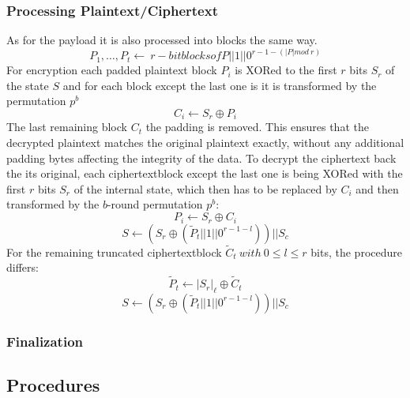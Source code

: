 \subsubsection{Processing Plaintext/Ciphertext}
As for the payload it is also processed into blocks the same way. 
$$P_1, \dots , P_t \leftarrow \ r-bit blocks of P || 1 || 0^{r-1-(|P| mod\ r)}$$
For encryption each padded plaintext block $P_i$ is XORed to the first $r$ bits $S_r$ of the state $S$ and for each block except the last one is it is transformed by the permutation $p^b$%
$$C_i \leftarrow S_r \oplus P_i$$
The last remaining block $C_t$ the padding is removed. This ensures that the decrypted plaintext matches the original plaintext exactly, without any additional padding bytes affecting the integrity of the data.
\newline
To decrypt the ciphertext back the its original, each ciphertextblock except the last one is being XORed with the first $r$ bits $S_r$ of the internal state, which then has to be replaced by $C_i$ and then transformed by the $b$-round permutation $p^b$:
$$ P_i\leftarrow S_r \oplus C_i $$
$$ S \leftarrow (S_r \oplus (\tilde P_t || 1 || 0^{r-1-l})) || S_c $$
For the remaining truncated ciphertextblock $\tilde C_t\ with\ 0 \leq l \le r$ bits, the procedure differs:
$$\tilde{P}_t \leftarrow \left| S_r \right|_\ell \oplus \tilde{C}_t$$
$$S \leftarrow (S_r \oplus (\tilde P_t || 1 || 0^{r-1-l})) || S_c$$
\cite{Ascon-v1.2}
\subsubsection{Finalization}
\subsection{Procedures}